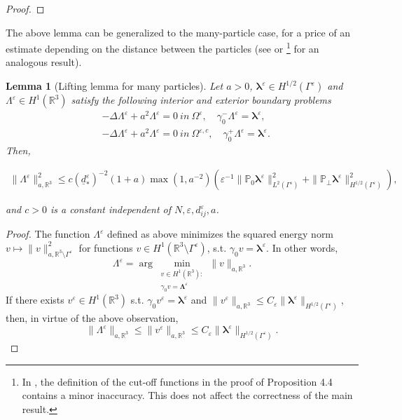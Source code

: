 \documentclass[]{article}
\newtheorem{lemma}{Lemma}
\numberwithin{equation}{section}
\numberwithin{theorem}{section}
\numberwithin{lemma}{section}
\numberwithin{corollary}{section}
\numberwithin{proposition}{section}
\numberwithin{definition}{section}
\newcommand{\re}{\varepsilon}
\renewcommand{\vec}{\boldsymbol}
\begin{document}
\begin{appendices}
\begin{proof}
		\end{proof}	
		The above lemma can be generalized to the many-particle case, for a price of an estimate depending on the distance between the particles (see \cite{hassan_stamm} or \cite[Proposition 4.4]{MK}\footnote{In \cite[Equation 4.20, p. 19]{MK}, the definition of the cut-off functions in the proof of Proposition 4.4 contains a minor inaccuracy. This does not affect the correctness of the main result.} for an analogous result).
		\begin{lemma}[Lifting lemma for many particles]
			\label{lifting_many_particles_proof}
			Let $a > 0$, $\vec{\lambda}^{\re} \in H^{1/2}(\Gamma^{\re})$ and $\Lambda^{\re} \in H^1(\mathbb{R}^3)$ satisfy the following interior and exterior boundary problems
			\begin{align*}%
				&-\Delta \Lambda^{\re} + a^2 \Lambda^{\re} = 0 ~in ~ \Omega^{\re}, \quad \gamma^-_0 \Lambda^{\re} = \vec{\lambda}^{\re}, \\ 
				&-\Delta \Lambda^{\re} + a^2 \Lambda^{\re} = 0 ~in ~ \Omega^{\re,c}, \quad \gamma^+_0 \Lambda^{\re} = \vec{\lambda}^{\re}.
			\end{align*} 
			Then, 
			
			\begin{align*}%
				\| \Lambda^{\re} \|^2_{a,\mathbb{R}^3} \leq c (\underline{d}^{\re}_*)^{-2} (1+a) \max(1, a^{-2}) \left(\re^{-1}  \| \mathbb{P}_0\vec{\lambda}^{\re} \|^2_{L^2(\Gamma^{\re})}+ \| \mathbb{P}_{\perp}\vec{\lambda}^{\re} \|^2_{H^{1/2}(\Gamma^{\re})}\right),
			\end{align*}
			
			and $c>0$ is a constant independent of $N, \re, d^{\re}_{ij}, a$. 
		\end{lemma}
		\begin{proof}
			The function $\Lambda^{\re}$ defined as above minimizes the squared energy norm $v\mapsto \|v\|^2_{a,\mathbb{R}^3\setminus\Gamma^{\re}}$ for functions $v\in H^1(\mathbb{R}^3\setminus\Gamma^{\re})$, s.t. $\gamma_0 v=\vec{\lambda}^{\re}$. In other words, 
			\[\Lambda^{\re} = \arg\min_{\substack{v \in H^1(\mathbb{R}^3): \\ \gamma_0 v = \boldsymbol{\Lambda}^{\re}}}\| v \|_{a, \mathbb{R}^3}.\]
			If there exists $v^{\re}\in H^1(\mathbb{R}^3)$ s.t. $\gamma_0 v^{\re}=\vec{\lambda}^{\re}$ and  $\|v^{\re}\|_{a,\mathbb{R}^3}\leq C_{\re}\|\vec{\lambda}^{\re}\|_{H^{1/2}(\Gamma^{\re})}$, then, in virtue of the above observation, 
			\begin{equation}
				\label{eq:lambadre}
				\| \Lambda^{\re} \|_{a, \mathbb{R}^3} \leq \| v^{\re} \|_{a,\mathbb{R}^3} \leq C_{\re} \| \vec{\lambda}^{\re} \|_{H^{1/2}(\Gamma^{\re})}.
			\end{equation}
			

\end{proof}
\end{appendices}
\end{document}
